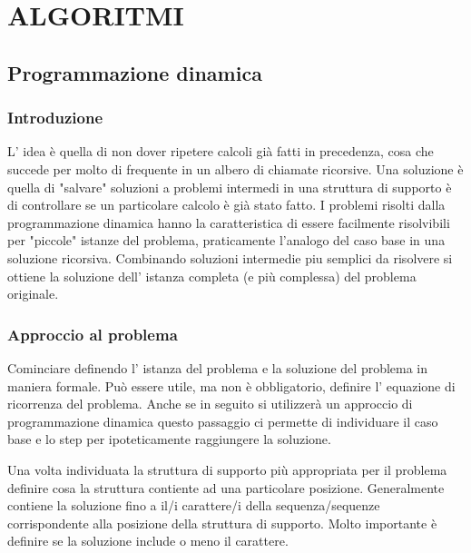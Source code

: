 \documentclass[11pt]{article}
\author{Aurelio}
\date{\today}
\title{}
\begin{document}
\setcounter{tocdepth}{10}
\tableofcontents


\section{ALGORITMI}
\label{sec:org1847582}

\subsection{Programmazione dinamica}
\label{sec:org948ab4a}

\subsubsection{Introduzione}
\label{sec:orgd2ad62e}

L' idea è quella di non dover ripetere calcoli già fatti in precedenza, cosa che succede per 
molto di frequente in un albero di chiamate ricorsive.
Una soluzione è quella di "salvare" soluzioni a problemi intermedi in una struttura di supporto
è di controllare se un particolare calcolo è già stato fatto.
I problemi risolti dalla programmazione dinamica hanno la caratteristica di essere facilmente
risolvibili per "piccole" istanze del problema, praticamente l'analogo del caso base in una soluzione ricorsiva.
Combinando soluzioni intermedie piu semplici da risolvere si ottiene la soluzione dell' istanza completa (e più complessa)
del problema originale.


\subsubsection{Approccio al problema}
\label{sec:org086f37a}

Cominciare definendo l' istanza del problema e la soluzione del problema in maniera formale.
Può essere utile, ma non è obbligatorio, definire l' equazione di ricorrenza del problema.
Anche se in seguito si utilizzerà un approccio di programmazione dinamica questo passaggio ci permette di 
individuare il caso base e lo step per ipoteticamente raggiungere la soluzione.

Una volta individuata la struttura di supporto più appropriata per il problema definire cosa
la struttura contiente ad una particolare posizione.
Generalmente contiene la soluzione fino a il/i carattere/i della sequenza/sequenze corrispondente alla
posizione della struttura di supporto. Molto importante è definire se la soluzione include o meno il carattere.
\end{document}
